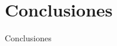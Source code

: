 \hypertarget{Conclusiones}{%
    \section{Conclusiones}\label{Conclusiones}}
    \vfill
    Conclusiones
    \vfill